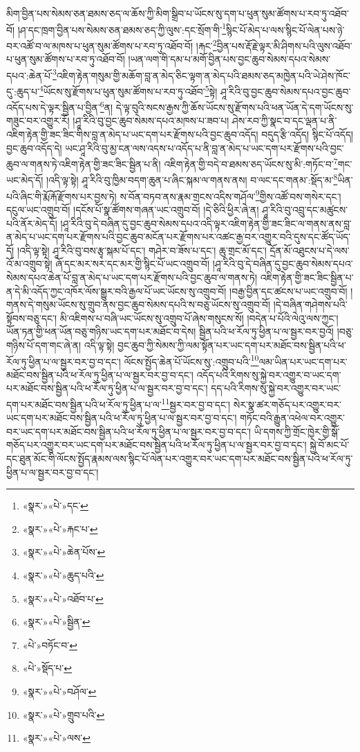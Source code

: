 མིག་བྱིན་པས་སེམས་ཅན་ཐམས་ཅད་ལ་ཆོས་ཀྱི་མིག་སྒྲིབ་པ་ཡོངས་སུ་དག་པ་ཕུན་སུམ་ཚོགས་པ་རབ་ཏུ་འཐོབ་བོ། །ཤ་དང་ཁྲག་བྱིན་པས་སེམས་ཅན་ཐམས་ཅད་ཀྱི་ལུས་:དང་སྲོག་གི་\footnote{«སྣར་»«པེ་»དང་}སྙིང་པོ་མེད་པ་ལས་སྙིང་པོ་ལེན་པས་ཉེ་བར་འཚོ་བ་ལ་མཁས་པ་ཕུན་སུམ་ཚོགས་པ་རབ་ཏུ་འཐོབ་བོ། །རྐང་\footnote{«སྣར་»«པེ་»རྐང་པ་}བྱིན་པས་རྡོ་རྗེ་ལྟར་མི་ཤིགས་པའི་ལུས་འཐོབ་པ་ཕུན་སུམ་ཚོགས་པ་རབ་ཏུ་འཐོབ་བོ། །ཡན་ལག་གི་དམ་པ་མགོ་བྱིན་པས་བྱང་ཆུབ་སེམས་དཔའ་སེམས་དཔའ་:ཆེན་པོ་\footnote{«སྣར་»«པེ་»ཆེན་པོས་}འཇིག་རྟེན་གསུམ་གྱི་མཆོག་བླ་ན་མེད་ཅིང་ལྟག་ན་མེད་པའི་ཐམས་ཅད་མཁྱེན་པའི་ཡེ་ཤེས་ཁོང་དུ་:ཆུད་པ་\footnote{«སྣར་»«པེ་»ཆུད་པའི་}ཡོངས་སུ་རྫོགས་པ་ཕུན་སུམ་ཚོགས་པ་རབ་ཏུ་འཐོབ་\footnote{«སྣར་»«པེ་»འཐོབ་པ་}སྟེ། ཤཱ་རིའི་བུ་བྱང་ཆུབ་སེམས་དཔའ་བྱང་ཆུབ་འདོད་པས་དེ་ལྟར་སྦྱིན་པ་བྱིན་\footnote{«སྣར་»«པེ་»སྦྱིན་}ན། དེ་ལྟ་བུའི་སངས་རྒྱས་ཀྱི་ཆོས་ཡོངས་སུ་རྫོགས་པའི་ཕན་ཡོན་དེ་དག་ཡོངས་སུ་གཟུང་བར་འགྱུར་རོ། །ཤཱ་རིའི་བུ་བྱང་ཆུབ་སེམས་དཔའ་མཁས་པ་ཟབ་པ། ཤེས་རབ་ཀྱི་སྣང་བ་དང་ལྡན་པ་ནི་འཇིག་རྟེན་གྱི་ཟང་ཟིང་གིས་བླ་ན་མེད་པ་ཡང་དག་པར་རྫོགས་པའི་བྱང་ཆུབ་འདོད། བདུད་རྩི་འདོད། སྙིང་པོ་འདོད། བྱང་ཆུབ་འདོད་དེ། ཡང་ཤཱ་རིའི་བུ་མྱ་ངན་ལས་འདས་པ་འདོད་པ་ནི་བླ་ན་མེད་པ་ཡང་དག་པར་རྫོགས་པའི་བྱང་ཆུབ་ལ་གནས་ཏེ་འཇིག་རྟེན་གྱི་ཟང་ཟིང་སྦྱིན་པ་ནི། འཇིག་རྟེན་གྱི་བདེ་བ་ཐམས་ཅད་ཡོངས་སུ་མི་:གཏོང་བ་\footnote{«པེ་»བཏོང་བ་}གང་ཡང་མེད་དོ། །འདི་ལྟ་སྟེ། ཤཱ་རིའི་བུ་ཁྱིམ་བདག་ཆུན་པ་ཞིང་སྐམ་ལ་གནས་ནས། བ་ལང་དང་གནམ་:སྡོད་མ་\footnote{«པེ་»སྡོད་པ་}ཡིན་པའི་ཞིང་གི་རྨོ་རྐོ་རྫོགས་པར་བྱས་ཏེ། ས་བོན་བཏབ་ནས་རྣམ་གྲངས་འདིས་གཤོལ་\footnote{«སྣར་»«པེ་»བཤོལ་}གྱིས་འཚོ་བས་གསེར་དང་། དངུལ་ཡང་འགྲུབ་བོ། །དངོས་པོ་སྣ་ཚོགས་གཞན་ཡང་འགྲུབ་བོ། །དེ་ཅིའི་ཕྱིར་ཞེ་ན། ཤཱ་རིའི་བུ་འབྲུ་དང་མཚུངས་པའི་ནོར་མེད་དོ། །ཤཱ་རིའི་བུ་དེ་བཞིན་དུ་བྱང་ཆུབ་སེམས་དཔའ་འདི་ལྟར་འཇིག་རྟེན་གྱི་ཟང་ཟིང་ལ་གནས་ནས་བླ་ན་མེད་པ་ཡང་དག་པར་རྫོགས་པའི་བྱང་ཆུབ་མངོན་པར་རྫོགས་པར་འཚང་རྒྱ་བར་འགྱུར་བའི་དུས་དང་ཚོད་ཡོད་དོ། །འདི་ལྟ་སྟེ། ཤཱ་རིའི་བུ་བས་རྩྭ་སྐམ་པོ་དང་། གཤེར་བ་ཟོས་པ་དང་། ཆུ་གྲང་མོ་དང་། དྲོན་མོ་འཐུངས་པ་དེ་ལས་འོ་མ་འགྲུབ་སྟེ། ཞོ་དང་མར་སར་དང་མར་གྱི་སྙིང་པོ་ཡང་འགྲུབ་བོ། །ཤཱ་རིའི་བུ་དེ་བཞིན་དུ་བྱང་ཆུབ་སེམས་དཔའ་སེམས་དཔའ་ཆེན་པོ་བླ་ན་མེད་པ་ཡང་དག་པར་རྫོགས་པའི་བྱང་ཆུབ་ལ་གནས་ཏེ། འཇིག་རྟེན་གྱི་ཟང་ཟིང་སྦྱིན་པ་ན་དེ་མི་འདོད་ཀྱང་འཁོར་ལོས་སྒྱུར་བའི་རྒྱལ་པོ་ཡང་ཡོངས་སུ་འགྲུབ་བོ། །བརྒྱ་བྱིན་དང་ཚངས་པ་ཡང་འགྲུབ་བོ། །གནས་དེ་གསུམ་ཡོངས་སུ་གྲུབ་ནས་བྱང་ཆུབ་སེམས་དཔའི་ས་བཅུ་ཡོངས་སུ་འགྲུབ་བོ། །དེ་བཞིན་གཤེགས་པའི་སྟོབས་བཅུ་དང་། མི་འཇིགས་པ་བཞི་ཡང་ཡོངས་སུ་འགྲུབ་པོ་ཞེས་གསུངས་སོ། །བདེན་པ་པོའི་ལེའུ་ལས་ཀྱང་། ཡོན་ཏན་གྱི་ཕན་ཡོན་བཅུ་གཉིས་ཡང་དག་པར་མཐོང་བ་དེས། སྦྱིན་པའི་ཕ་རོལ་ཏུ་ཕྱིན་པ་ལ་སྦྱར་བར་བྱའོ། །བཅུ་གཉིས་པོ་དག་གང་ཞེ་ན། འདི་ལྟ་སྟེ། བྱང་ཆུབ་ཀྱི་སེམས་ཀྱི་ལམ་སྟོན་པར་ཡང་དག་པར་མཐོང་བས་སྦྱིན་པའི་ཕ་རོལ་ཏུ་ཕྱིན་པ་ལ་སྦྱར་བར་བྱ་བ་དང་། ལོངས་སྤྱོད་ཆེན་པོ་ཡོངས་སུ་:འགྲུབ་པའི་\footnote{«སྣར་»«པེ་»གྲུབ་པའི་}ལམ་ཡིན་པར་ཡང་དག་པར་མཐོང་བས་སྦྱིན་པའི་ཕ་རོལ་ཏུ་ཕྱིན་པ་ལ་སྦྱར་བར་བྱ་བ་དང་། འདོད་པའི་རིགས་སུ་སྐྱེ་བར་འགྱུར་བ་ཡང་དག་པར་མཐོང་བས་སྦྱིན་པའི་ཕ་རོལ་ཏུ་ཕྱིན་པ་ལ་སྦྱར་བར་བྱ་བ་དང་། དད་པའི་རིགས་སུ་སྐྱེ་བར་འགྱུར་བར་ཡང་དག་པར་མཐོང་བས་སྦྱིན་པའི་ཕ་རོལ་ཏུ་ཕྱིན་པ་ལ་\footnote{«སྣར་»«པེ་»ལས་}སྦྱར་བར་བྱ་བ་དང་། སེར་སྣ་ཚར་གཅོད་པར་འགྱུར་བར་ཡང་དག་པར་མཐོང་བས་སྦྱིན་པའི་ཕ་རོལ་ཏུ་ཕྱིན་པ་ལ་སྦྱར་བར་བྱ་བ་དང་། གཏོང་བའི་རྒྱུན་འཕེལ་བར་འགྱུར་བར་ཡང་དག་པར་མཐོང་བས་སྦྱིན་པའི་ཕ་རོལ་ཏུ་ཕྱིན་པ་ལ་སྦྱར་བར་བྱ་བ་དང་། ཡི་དགས་ཀྱི་གྲོང་ཁྱེར་གྱི་སྒོ་གཅོད་པར་འགྱུར་བར་ཡང་དག་པར་མཐོང་བས་སྦྱིན་པའི་ཕ་རོལ་ཏུ་ཕྱིན་པ་ལ་སྦྱར་བར་བྱ་བ་དང་། སྐྱེ་བོ་མང་པོ་དང་ཐུན་མོང་གི་ལོངས་སྤྱོད་རྣམས་ལས་སྙིང་པོ་ལེན་པར་འགྱུར་བར་ཡང་དག་པར་མཐོང་བས་སྦྱིན་པའི་ཕ་རོལ་ཏུ་ཕྱིན་པ་ལ་སྦྱར་བར་བྱ་བ་དང་། 